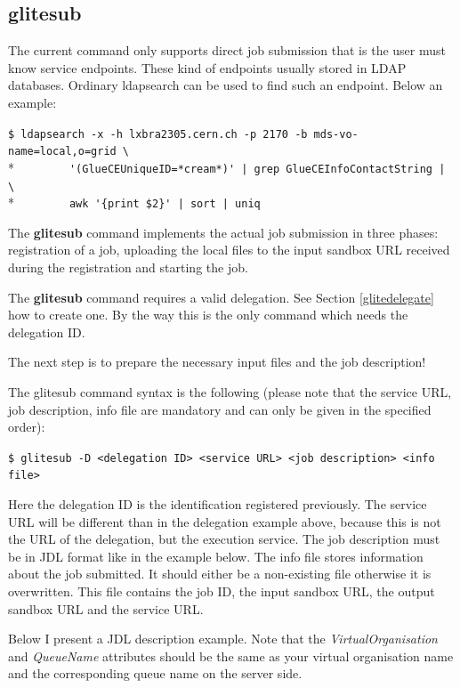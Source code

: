 \documentclass{article}
\begin{document}
\subsection{glitesub}
\label{glitesub}
The current command only supports direct job submission that is the user must know service endpoints. These kind of endpoints usually stored in LDAP databases. Ordinary ldapsearch can be used to find such an endpoint. Below an example:\par
\begin{shaded}
\verb#$ ldapsearch -x -h lxbra2305.cern.ch -p 2170 -b mds-vo-name=local,o=grid \#\\*
\verb#        '(GlueCEUniqueID=*cream*)' | grep GlueCEInfoContactString | \#\\*
\verb#        awk '{print $2}' | sort | uniq#
\end{shaded}
The \textbf{glitesub} command implements the actual job submission in three phases: registration of a job, uploading the local files to the input sandbox URL received during the registration and starting the job.\par
The \textbf{glitesub} command requires a valid delegation. See Section \ref{glitedelegate} how to create one. By the way this is the only command which needs the delegation ID.\par The next step is to prepare the necessary input files and the job description!\par
The glitesub command syntax is the following (please note that the service URL, job description, info file are mandatory and can only be given in the specified order):
\begin{shaded}\verb#$ glitesub -D <delegation ID> <service URL> <job description> <info file>#\end{shaded}
Here the delegation ID is the identification registered previously. The service URL will be different than in the delegation example above, because this is not the URL of the delegation, but the execution service. The job description must be in JDL format like in the example below. The info file stores information about the job submitted. It should either be a non-existing file otherwise it is overwritten. This file contains the job ID, the input sandbox URL, the output sandbox URL and the service URL.\par
Below I present a JDL description example. Note that the \textit{VirtualOrganisation} and \textit{QueueName} attributes should be the same as your virtual organisation name and the corresponding queue name on the server side.\par
\end{document}
